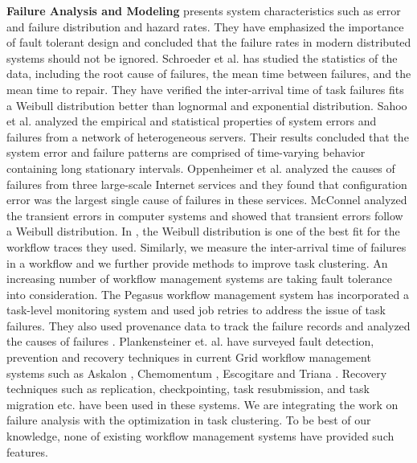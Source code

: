 \textbf{Failure Analysis and Modeling} \cite{Tang1990} presents system characteristics such as error and failure distribution and hazard rates. They have emphasized the importance of fault tolerant design and concluded that the failure rates in modern distributed systems should not be ignored. Schroeder et al. \cite{Schroeder2006} has studied the statistics of the data, including the root cause of failures, the mean time between failures, and the mean time to repair.  They have verified the inter-arrival time of task failures fits a Weibull distribution better than lognormal and exponential distribution. Sahoo et al. \cite{Sahoo2004} analyzed the empirical and statistical properties of system errors and failures from a network of heterogeneous servers. Their results concluded that the system error and failure patterns are comprised of time-varying behavior containing long stationary intervals.
Oppenheimer et al. \cite{Oppenheimer2002} analyzed the causes of failures from three large-scale Internet services and they found that configuration error was the largest single cause of failures in these services. McConnel \cite{McConnel1979} analyzed the transient errors in computer systems and showed that transient errors follow a Weibull distribution. In \cite{Sun2003, Iosup2008}, the Weibull distribution is one of the best fit for the workflow traces they used.  Similarly, we measure the inter-arrival time of failures in a workflow and we further provide methods to improve task clustering.  
An increasing number of workflow management systems are taking fault tolerance into consideration. The Pegasus workflow management system \cite{Deelman2004} has incorporated a task-level monitoring system and used job retries to address the issue of task failures. They also used provenance data to track the failure records and analyzed the causes of failures \cite{Samak2011}. Plankensteiner et. al. \cite{plankensteiner2009fault} have surveyed fault detection, prevention and recovery techniques in current Grid workflow management systems such as Askalon \cite{fahringer2007askalon}, Chemomentum \cite{schuller2008chemomentum}, Escogitare \cite{laforenza2007biological} and Triana \cite{taylor2007triana}. Recovery techniques such as replication, checkpointing, task resubmission, and task migration etc. have been used in these systems. We are integrating the work on failure analysis with the optimization in task clustering. To be best of our knowledge, none of existing workflow management systems have provided such features. 

